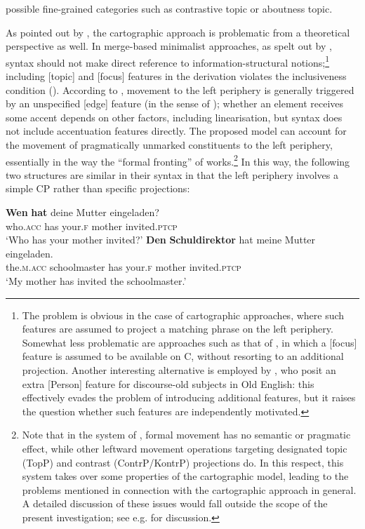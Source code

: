 possible fine-grained categories such as contrastive topic or aboutness topic.

As pointed out by \citet{fanselowlenertova2011}, the cartographic approach is problematic from a theoretical perspective as well. In merge-based minimalist approaches, as spelt out by \citet{chomsky2008}, syntax should not make direct reference to information-structural notions;\footnote{The problem is obvious in the case of cartographic approaches, where such features are assumed to project a matching phrase on the left periphery. Somewhat less problematic are approaches such as that of \citet[163--176]{miyagawa2017}, in which a [focus] feature is assumed to be available on C, without resorting to an additional projection. Another interesting alternative is employed by \citet[40--45]{biberauervankemenade2011}, who posit an extra [Person] feature for discourse-old subjects in Old English: this effectively evades the problem of introducing additional features, but it raises the question whether such features are independently motivated.} including [topic] and [focus] features in the derivation violates the inclusiveness condition (\citealt{chomsky1995}). According to \citet{fanselowlenertova2011}, movement to the left periphery is generally triggered by an unspecified [edge] feature (in the sense of \citealt{chomsky2008}); whether an element receives some accent depends on other factors, including linearisation, but syntax does not include accentuation features directly. The proposed model can account for the movement of pragmatically unmarked constituents to the left periphery, essentially in the way the ``formal fronting'' of \citet{frey2004} works.\footnote{Note that in the system of \citet{frey2004, frey2005, frey2010}, formal movement has no semantic or pragmatic effect, while other leftward movement operations targeting designated topic (TopP) and contrast (ContrP/KontrP) projections do. In this respect, this system takes over some properties of the cartographic model, leading to the problems mentioned in connection with the cartographic approach in general. A detailed discussion of these issues would fall outside the scope of the present investigation; see e.g. \citet{wierzba2017diss} for discussion.} In this way, the following two structures are similar in their syntax in that the left periphery involves a simple CP rather than specific projections:

\ea
\ea \gll \textbf{Wen} \textbf{hat} deine Mutter eingeladen? \label{germanwh}\\
who.\textsc{acc} has your.\textsc{f} mother invited.\textsc{ptcp}\\
\glt `Who has your mother invited?'
\ex \gll \textbf{Den} \textbf{Schuldirektor} hat meine Mutter eingeladen. \label{germanv2}\\
the.\textsc{m.acc} schoolmaster has your.\textsc{f} mother invited.\textsc{ptcp}\\
\glt `My mother has invited the schoolmaster.'
\z
\z

